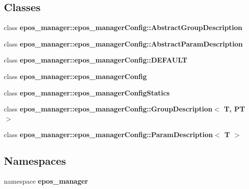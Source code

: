 \subsection*{\-Classes}
\begin{DoxyCompactItemize}
\item 
class {\bf epos\-\_\-manager\-::epos\-\_\-manager\-Config\-::\-Abstract\-Group\-Description}
\item 
class {\bf epos\-\_\-manager\-::epos\-\_\-manager\-Config\-::\-Abstract\-Param\-Description}
\item 
class {\bf epos\-\_\-manager\-::epos\-\_\-manager\-Config\-::\-D\-E\-F\-A\-U\-L\-T}
\item 
class {\bf epos\-\_\-manager\-::epos\-\_\-manager\-Config}
\item 
class {\bf epos\-\_\-manager\-::epos\-\_\-manager\-Config\-Statics}
\item 
class {\bf epos\-\_\-manager\-::epos\-\_\-manager\-Config\-::\-Group\-Description$<$ T, P\-T $>$}
\item 
class {\bf epos\-\_\-manager\-::epos\-\_\-manager\-Config\-::\-Param\-Description$<$ T $>$}
\end{DoxyCompactItemize}
\subsection*{\-Namespaces}
\begin{DoxyCompactItemize}
\item 
namespace {\bf epos\-\_\-manager}
\end{DoxyCompactItemize}
